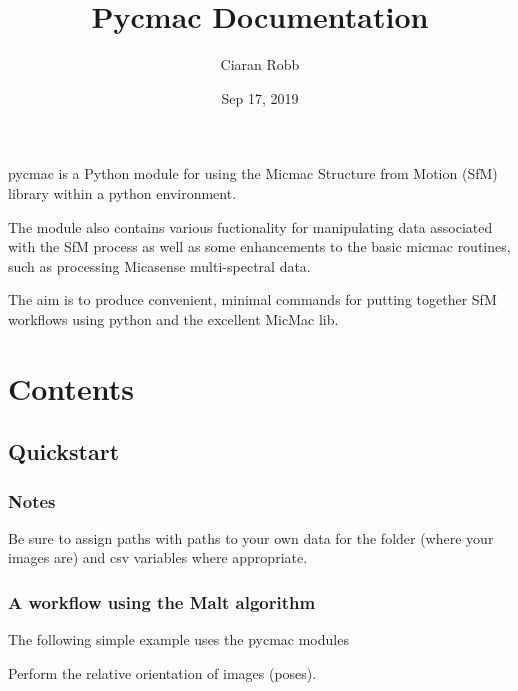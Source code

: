 \documentclass[letterpaper,10pt,english]{sphinxmanual}
\title{Pycmac Documentation}
\date{Sep 17, 2019}
\author{Ciaran Robb}
\begin{document}
\pagestyle{empty}
\sphinxmaketitle
\pagestyle{plain}
\sphinxtableofcontents
\pagestyle{normal}
\label{\detokenize{index::doc}}


pycmac is a Python module for using the Micmac Structure from Motion (SfM) library within a python environment.

The module also contains various fuctionality for manipulating data associated with the SfM process as well as some enhancements to the basic micmac routines, such as processing Micasense multi-spectral data.

The aim is to produce convenient, minimal commands for putting together SfM workflows using python and the excellent MicMac lib.


\chapter{Contents}
\label{\detokenize{index:contents}}

\section{Quickstart}
\label{\detokenize{quickstart:quickstart}}\label{\detokenize{quickstart:id1}}\label{\detokenize{quickstart::doc}}

\subsection{Notes}
\label{\detokenize{quickstart:notes}}
Be sure to assign paths with paths to your own data for the folder (where your images are) and csv variables where appropriate.


\subsection{A workflow using the Malt algorithm}
\label{\detokenize{quickstart:a-workflow-using-the-malt-algorithm}}
The following simple example uses the pycmac modules

\begin{sphinxVerbatim}[commandchars=\\\{\}]
    
\end{sphinxVerbatim}

Perform the relative orientation of images (poses).

\begin{sphinxVerbatim}[commandchars=\\\{\}]
  

     
\end{sphinxVerbatim}
\end{document}

